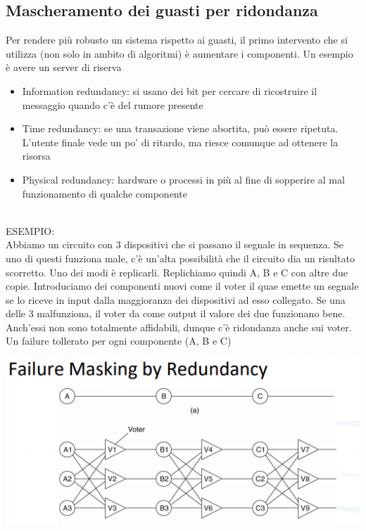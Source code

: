 \subsection{Mascheramento dei guasti per ridondanza}
Per rendere più robusto un sistema rispetto ai guasti, il primo intervento che si utilizza (non solo in ambito di algoritmi) è aumentare i componenti. Un esempio è avere un server di riserva

\begin{itemize}
    \item Information redundancy: si usano dei bit per cercare di ricostruire il messaggio quando c'è del rumore presente
    \item Time redundancy: se una transazione viene abortita, può essere ripetuta. L'utente finale vede un po' di ritardo, ma riesce comunque ad ottenere la risorsa
    \item Physical redundancy: hardware o processi in più al fine di sopperire al mal funzionamento di qualche componente
\end{itemize}
\phantom \\

ESEMPIO:\\
Abbiamo un circuito con 3 dispositivi che si passano il segnale in sequenza. Se uno di questi funziona male, c'è un'alta possibilità che il circuito dia un risultato scorretto.
Uno dei modi è replicarli. Replichiamo quindi A, B e C con altre due copie.
Introduciamo dei componenti nuovi come il voter il quae emette un segnale se lo riceve in input dalla maggioranza dei dispositivi ad esso collegato. Se una delle 3 malfunziona, il voter da come output il valore dei due funzionano bene. Anch'essi non sono totalmente affidabili, dunque c'è ridondanza anche sui voter. Un failure tollerato per ogni componente (A, B e C)

\begin{center}
    \includegraphics[width = 1\textwidth]{images/lezione5/fmr.png}
\end{center}

